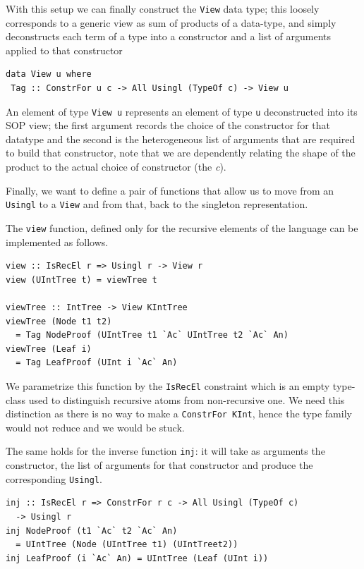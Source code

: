 \documentclass[11pt, titlepage]{article}
\newcommand{\toHaskell}[1]{\texttt{#1}\xspace}
\begin{document}
With this setup we can finally construct the \texttt{View} data type; this loosely corresponds to a generic view as sum of products of a data-type, and simply deconstructs each term of a type into a constructor and a list of arguments applied to that constructor

\begin{verbatim}
data View u where
 Tag :: ConstrFor u c -> All Usingl (TypeOf c) -> View u
\end{verbatim}

An element of type \texttt{View u} represents an element of type \texttt{u}  deconstructed into its SOP view; the first argument records the choice 
of the constructor for that datatype and the second is the heterogeneous list of 
arguments that are required to build that constructor, note that we are 
dependently relating the shape of the product to the actual choice of 
constructor (the \emph{c}).

Finally, we want to define a pair of functions that allow us to move from an \toHaskell{Usingl} to a \toHaskell{View} and from that, back to the singleton representation.

The \toHaskell{view} function, defined only for the recursive elements of the language can be implemented as follows.

\begin{verbatim}
view :: IsRecEl r => Usingl r -> View r
view (UIntTree t) = viewTree t

viewTree :: IntTree -> View KIntTree
viewTree (Node t1 t2) 
  = Tag NodeProof (UIntTree t1 `Ac` UIntTree t2 `Ac` An)
viewTree (Leaf i)     
  = Tag LeafProof (UInt i `Ac` An)
\end{verbatim}

We parametrize this function by the \toHaskell{IsRecEl} constraint which is an empty type-class used to distinguish recursive atoms from non-recursive one. We need this distinction as there is no way to make a \toHaskell{ConstrFor KInt}, hence the type family would not reduce and we would be stuck.

The same holds for the inverse function \toHaskell{inj}: it will take as arguments the constructor, the list of arguments for that constructor and produce the corresponding \toHaskell{Usingl}.

\begin{verbatim}
inj :: IsRecEl r => ConstrFor r c -> All Usingl (TypeOf c) 
  -> Usingl r
inj NodeProof (t1 `Ac` t2 `Ac` An) 
  = UIntTree (Node (UIntTree t1) (UIntTreet2))
inj LeafProof (i `Ac` An) = UIntTree (Leaf (UInt i))
\end{verbatim}
\end{document}
